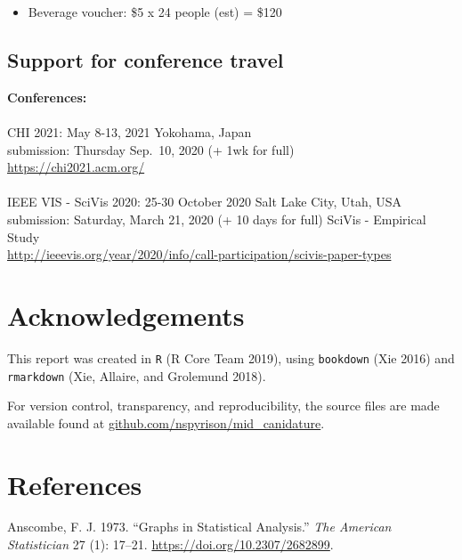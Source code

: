 \documentclass[11,]{article}
\providecommand{\tightlist}{%
  \setlength{\itemsep}{0pt}\setlength{\parskip}{0pt}}
\begin{document}
\begin{itemize}
\tightlist
\item
  Beverage voucher: \$5 x 24 people (est) = \$120
\end{itemize}

\hypertarget{support-for-conference-travel}{%
\subsection{Support for conference travel}\label{support-for-conference-travel}}

\textbf{Conferences:}\\
~\\
CHI 2021: May 8-13, 2021 Yokohama, Japan\\
submission: Thursday Sep.~10, 2020 (+ 1wk for full)\\
\url{https://chi2021.acm.org/}~\\
~\\
IEEE VIS - SciVis 2020: 25-30 October 2020 Salt Lake City, Utah, USA\\
submission: Saturday, March 21, 2020 (+ 10 days for full) SciVis - Empirical Study\\
\url{http://ieeevis.org/year/2020/info/call-participation/scivis-paper-types}

\hypertarget{sec:acknowledgements}{%
\section{Acknowledgements}\label{sec:acknowledgements}}

This report was created in \texttt{R} (R Core Team 2019), using \texttt{bookdown} (Xie 2016) and \texttt{rmarkdown} (Xie, Allaire, and Grolemund 2018).

For version control, transparency, and reproducibility, the source files are made available found at \href{https://github.com/nspyrison/mid_canidature}{github.com/nspyrison/mid\_canidature}.

\hypertarget{references}{%
\section*{References}\label{references}}

\hypertarget{refs}{}
\leavevmode\hypertarget{ref-anscombe_graphs_1973}{}%
Anscombe, F. J. 1973. ``Graphs in Statistical Analysis.'' \emph{The American Statistician} 27 (1): 17--21. \url{https://doi.org/10.2307/2682899}.
\end{document}
